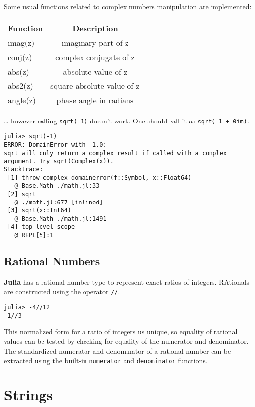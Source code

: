 \documentclass[
]{article}
\begin{document}
Some usual functions related to complex numbers manipulation are
implemented:

\begin{longtable}[]{@{}lc@{}}
\toprule\noalign{}
Function & Description \\
\midrule\noalign{}
\endhead
\bottomrule\noalign{}
\endlastfoot
imag(z) & imaginary part of z \\
conj(z) & complex conjugate of z \\
abs(z) & absolute value of z \\
abs2(z) & square absolute value of z \\
angle(z) & phase angle in radians \\
\end{longtable}

\ldots{} however calling \texttt{sqrt(-1)} doesn't work. One should call
it as \texttt{sqrt(-1\ +\ 0im)}.

\begin{verbatim}
julia> sqrt(-1)
ERROR: DomainError with -1.0:
sqrt will only return a complex result if called with a complex argument. Try sqrt(Complex(x)).
Stacktrace:
 [1] throw_complex_domainerror(f::Symbol, x::Float64)
   @ Base.Math ./math.jl:33
 [2] sqrt
   @ ./math.jl:677 [inlined]
 [3] sqrt(x::Int64)
   @ Base.Math ./math.jl:1491
 [4] top-level scope
   @ REPL[5]:1
\end{verbatim}

\hypertarget{rational-numbers}{%
\subsection{Rational Numbers}\label{rational-numbers}}

\textbf{Julia} has a rational number type to represent exact ratios of
integers. RAtionals are constructed using the operator \texttt{//}.

\begin{verbatim}
julia> -4//12
-1//3
\end{verbatim}

This normalized form for a ratio of integers us unique, so equality of
rational values can be tested by checking for equality of the numerator
and denominator. The standardized numerator and denominator of a
rational number can be extracted using the built-in \texttt{numerator}
and \texttt{denominator} functions.

\newpage

\hypertarget{strings}{%
\section{Strings}\label{strings}}
\end{document}
